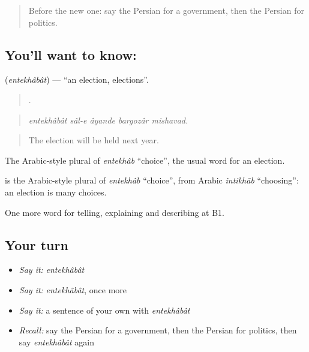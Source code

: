 \label{lesson:FA-C409-entekhabat}



\begin{quote}
Before the new one: say the Persian for a government, then the Persian for politics.
\end{quote}

\subsection*{You'll want to know: }
\textbf{} (\emph{entekhâbât}) — \textquotedblleft{}an election, elections\textquotedblright{}.

\begin{quote}
    .
\end{quote}

\begin{quote}
\emph{entekhâbât sâl-e âyande bargozâr mishavad.}
\end{quote}

\begin{quote}
The election will be held next year.
\end{quote}

The Arabic-style plural of \emph{entekhâb} \textquotedblleft{}choice\textquotedblright{}, the usual word for an election.

\begin{cousinweb}
\textbf{} is the Arabic-style plural of \emph{entekhâb} \textquotedblleft{}choice\textquotedblright{}, from Arabic \emph{intikhāb} \textquotedblleft{}choosing\textquotedblright{}: an election is many choices.
\end{cousinweb}

\begin{grammarlens}[title={What you've built}]
One more word for telling, explaining and describing at B1.
\end{grammarlens}

\subsection*{Your turn}
\begin{itemize}
\raggedright
  \item \emph{Say it:} \emph{entekhâbât}
  \item \emph{Say it:} \emph{entekhâbât}, once more
  \item \emph{Say it:} a sentence of your own with \emph{entekhâbât}
  \item \emph{Recall:} say the Persian for a government, then the Persian for politics, then say \emph{entekhâbât} again
\end{itemize}

